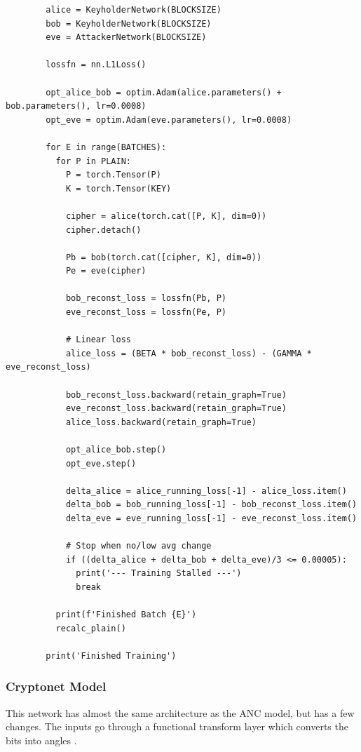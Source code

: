 \documentclass[a4paper]{article}
\begin{document}
      \begin{lstlisting}
        alice = KeyholderNetwork(BLOCKSIZE)
        bob = KeyholderNetwork(BLOCKSIZE)
        eve = AttackerNetwork(BLOCKSIZE)

        lossfn = nn.L1Loss()

        opt_alice_bob = optim.Adam(alice.parameters() + bob.parameters(), lr=0.0008)
        opt_eve = optim.Adam(eve.parameters(), lr=0.0008)

        for E in range(BATCHES):
          for P in PLAIN:
            P = torch.Tensor(P)
            K = torch.Tensor(KEY)

            cipher = alice(torch.cat([P, K], dim=0))
            cipher.detach()

            Pb = bob(torch.cat([cipher, K], dim=0))
            Pe = eve(cipher)

            bob_reconst_loss = lossfn(Pb, P)
            eve_reconst_loss = lossfn(Pe, P)

            # Linear loss
            alice_loss = (BETA * bob_reconst_loss) - (GAMMA * eve_reconst_loss)

            bob_reconst_loss.backward(retain_graph=True)
            eve_reconst_loss.backward(retain_graph=True)
            alice_loss.backward(retain_graph=True)

            opt_alice_bob.step()
            opt_eve.step()

            delta_alice = alice_running_loss[-1] - alice_loss.item()
            delta_bob = bob_running_loss[-1] - bob_reconst_loss.item()
            delta_eve = eve_running_loss[-1] - eve_reconst_loss.item()

            # Stop when no/low avg change
            if ((delta_alice + delta_bob + delta_eve)/3 <= 0.00005):
              print('--- Training Stalled ---')
              break

          print(f'Finished Batch {E}')
          recalc_plain()

        print('Finished Training')
      \end{lstlisting}

      \subsubsection{Cryptonet Model}
      This network has almost the same architecture as the ANC model, but has a few changes.
      The inputs go through a functional transform layer which converts the bits into angles \cite{perfanc}.
      
\end{document}
